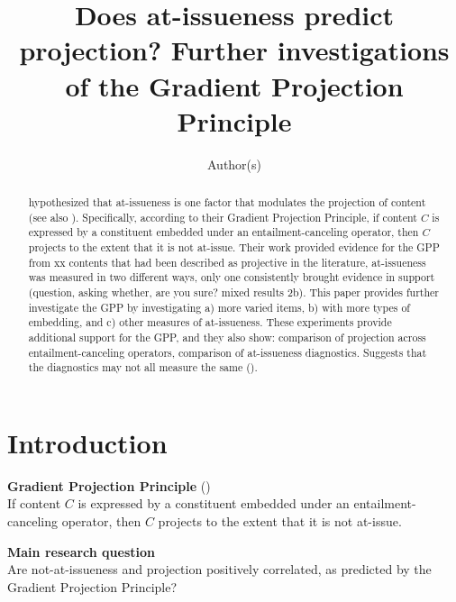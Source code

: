 \documentclass[11pt,fleqn]{article}
\title{Does at-issueness predict projection? Further investigations of the Gradient Projection Principle}
\author{Author(s)}
\newcommand{\6}{\mbox{$[\hspace*{-.6mm}[$}}
\newcommand{\9}{\mbox{$]\hspace*{-.6mm}]$}}
\begin{document}

\maketitle

\vspace*{-1cm}

\begin{abstract}

\citealt{tbd-variability} hypothesized that at-issueness is one factor that modulates the projection of content (see also \citealt{brst-salt10,brst-ar}). Specifically, according to their Gradient Projection Principle, if content $C$ is expressed by a constituent embedded under an entailment-canceling operator, then $C$ projects to the extent that it is not at-issue. Their work provided evidence for the GPP from xx contents that had been described as projective in the literature, at-issueness was measured in two different ways, only one consistently brought evidence in support (question, asking whether, are you sure? mixed results 2b). This paper provides further investigate the GPP by investigating a) more varied items, b) with more types of embedding, and c) other measures of at-issueness. These experiments provide additional support for the GPP, and they also show: comparison of projection across entailment-canceling operators, comparison of at-issueness diagnostics. Suggests that the diagnostics may not all measure the same (\citealt{snider2017}).

\end{abstract}

		
\section{Introduction}\label{s1}

\begin{exe}
\ex\label{gpp} {\bf Gradient Projection Principle} \hfill (\citealt[400]{tbd-variability}) \\ If content $C$ is expressed by a constituent embedded under an entailment-canceling operator, then $C$ projects to the extent that it is not at-issue.
\end{exe}


\begin{exe}
\ex\label{rqs} {\bf Main research question} \\
Are not-at-issueness and projection positively correlated, as predicted by the Gradient Projection Principle?
\end{exe}
\end{document}
